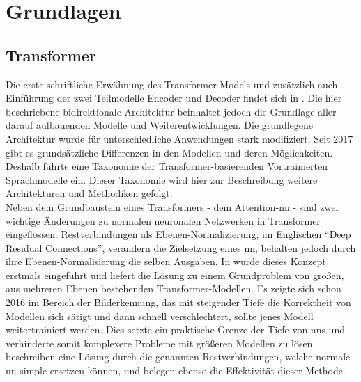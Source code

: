 \chapter{Grundlagen}\label{ch:preliminaries}
\section{Transformer}\label{sec:transformer}
Die erste schriftliche Erwähnung des Transformer-Models und zusätzlich auch Einführung der zwei Teilmodelle Encoder und Decoder findet sich in \citet{attention}.
Die hier beschriebene bidirektionale Architektur beinhaltet jedoch die Grundlage aller darauf aufbauenden Modelle und Weiterentwicklungen. 
Die grundlegene Architektur wurde für unterschiedliche Anwendungen stark modifiziert. 
Seit 2017 gibt es grundsätzliche Differenzen in den Modellen und deren Möglichkeiten. 
Deshalb führte \citet{ammus} eine Taxonomie der Transformer-basierenden Vortrainierten Sprachmodelle ein. 
Dieser Taxonomie wird hier zur Beschreibung weitere Architekturen und Methodiken gefolgt.\\

Neben dem Grundbaustein eines Transformers - dem Attention-\ac{nn} - sind zwei wichtige Änderungen zu normalen neuronalen Netzwerken in Transformer eingeflossen. 
Restverbindungen als Ebenen-Normalizierung, im Englischen \enquote{Deep Residual Connections}, verändern die Zielsetzung eines \ac{nn}, behalten jedoch durch ihre Ebenen-Normalisierung die selben Ausgaben. 
In \citet{deep_residual} wurde dieses Konzept erstmals eingeführt und liefert die Lösung zu einem Grundproblem von großen, aus mehreren Ebenen bestehenden Transformer-Modellen. 
Es zeigte sich schon 2016 im Bereich der Bilderkennung, das mit steigender Tiefe die Korrektheit von Modellen sich sätigt und dann schnell verschlechtert, sollte jenes Modell weitertrainiert werden. 
Dies setzte ein praktische Grenze der Tiefe von \ac{nn}s und verhinderte somit komplexere Probleme mit größeren Modellen zu lösen. 
\citet{deep_residual} beschreiben eine Lösung durch die genannten Restverbindungen, welche normale \ac{nn} simple ersetzen können, und belegen ebenso die Effektivität dieser Methode.\\

